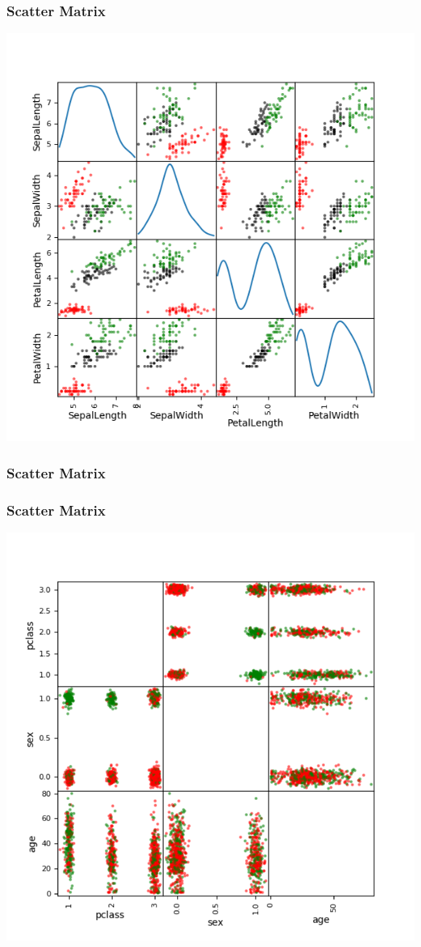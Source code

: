 \documentclass[11pt]{beamer}
\newenvironment{slide}[1]{%
\begin{frame}[environment=slide]
\frametitle{#1}
}{%
\end{frame}
}
\newcommand{\Python}[1]{
	{\small	}
}
\begin{document}
\begin{slide}{Scatter Matrix}
\begin{center}
\includegraphics[scale=0.4]{iris_matrix}
\end{center}
\end{slide}


\begin{slide}{Scatter Matrix}
\begin{center}
\Python{scatter_matrix}
\end{center}
\end{slide}

\begin{slide}{Scatter Matrix}
\begin{center}
\includegraphics[scale=0.4]{titanic_matrix}
\end{center}
\end{slide}
\end{document}
